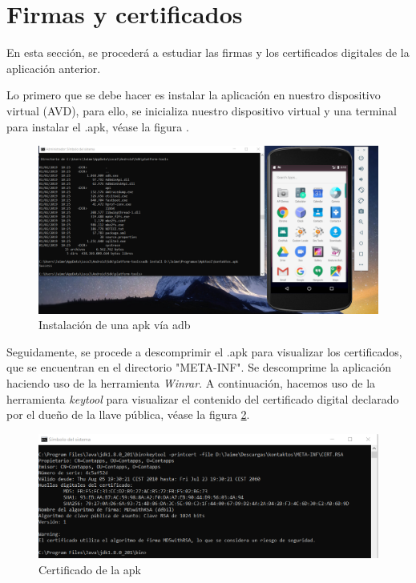 \documentclass[a4paper,11pt,oneside]{book}
\begin{document}
\clearpage
\section{Firmas y certificados}

En esta sección, se procederá a estudiar las firmas y los certificados digitales de la aplicación anterior. 

Lo primero que se debe hacer es instalar la aplicación en nuestro dispositivo virtual (AVD), para ello, se inicializa nuestro dispositivo virtual y una terminal para instalar el .apk, véase la figura .

\begin{figure}[h]
\centering
\includegraphics[width=\textwidth]{Punto51}
\caption{Instalación de una apk vía adb}
\label{Punto51}
\end{figure}

Seguidamente, se procede a descomprimir el .apk para visualizar los certificados, que se encuentran en el directorio "META-INF". Se descomprime la aplicación haciendo uso de la herramienta \emph{Winrar}. A continuación, hacemos uso de la herramienta \emph{keytool} para visualizar el contenido del certificado digital declarado por el dueño de la llave pública, véase la figura \ref{Punto52}.

\begin{figure}[h]
\centering
\includegraphics[width=\textwidth]{Punto52}
\caption{Certificado de la apk}
\label{Punto52}
\end{figure}
\clearpage
\end{document}
